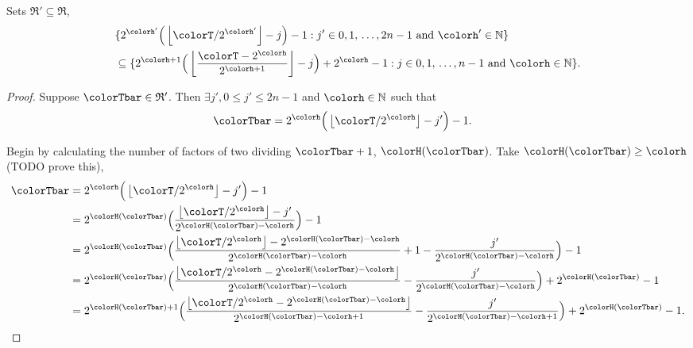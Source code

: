 \begin{sublemma}
\label{thm:tilted-subsetr}
Sets $\mathfrak{R}' \subseteq \mathfrak{R}$,
\begin{align*}
&\{
  2^{\colorh'}\Big(\left\lfloor \colorT / 2^{\colorh'} \right\rfloor - j\Big) - 1
  :
  j' \in 0,1,\,\ldots,2n-1
  \text{ and }
  \colorh' \in \mathbb{N}
\}\\
&\subseteq
\{
  2^{\colorh + 1}\Big( \left\lfloor\frac{\colorT - 2^{\colorh}}{2^{\colorh + 1}} \right\rfloor - j\Big) + 2^{\colorh} - 1
  :
  j \in 0,1,\,\ldots,n-1
  \text{ and }
  \colorh \in \mathbb{N}
\}.
\end{align*}

\end{sublemma}
\begin{proof}
Suppose $\colorTbar \in \mathfrak{R}'$.
Then $\exists j',  0 \leq j' \leq 2n - 1$ and $\colorh \in \mathbb{N}$ such that
\begin{align*}
\colorTbar
&= 2^{\colorh}\Big(\left\lfloor \colorT / 2^{\colorh} \right\rfloor - j'\Big) - 1.
\end{align*}

Begin by calculating the number of factors of two dividing $\colorTbar + 1$, $\colorH(\colorTbar)$.
Take $\colorH(\colorTbar) \geq \colorh$ (TODO prove this),
\begin{align*}
\colorTbar
&= 2^{\colorh}\Big(\left\lfloor \colorT / 2^{\colorh} \right\rfloor - j'\Big) - 1\\
&= 2^{\colorH(\colorTbar)} \Big(
\frac{\left\lfloor \colorT / 2^{\colorh} \right\rfloor - j'}{2^{\colorH(\colorTbar) - \colorh}}
\Big)
- 1\\
&= 2^{\colorH(\colorTbar)} \Big(
\frac{\left\lfloor \colorT / 2^{\colorh} \right\rfloor - 2^{\colorH(\colorTbar) - \colorh}}{2^{\colorH(\colorTbar) - \colorh}}
+ 1
- \frac{j'}{2^{\colorH(\colorTbar) - \colorh}}
\Big)
- 1\\
&= 2^{\colorH(\colorTbar)} \Big(
\frac{\left\lfloor \colorT / 2^{\colorh} - 2^{\colorH(\colorTbar) - \colorh} \right\rfloor}{2^{\colorH(\colorTbar) - \colorh}}
- \frac{j'}{2^{\colorH(\colorTbar) - \colorh}}
\Big)
+ 2^{\colorH(\colorTbar)}
- 1\\
&= 2^{\colorH(\colorTbar) + 1} \Big(
\frac{\left\lfloor \colorT / 2^{\colorh} - 2^{\colorH(\colorTbar) - \colorh} \right\rfloor}{2^{\colorH(\colorTbar) - \colorh + 1}}
- \frac{j'}{2^{\colorH(\colorTbar) - \colorh + 1}}
\Big)
+ 2^{\colorH(\colorTbar)}
- 1.
\end{align*}


\end{proof}
